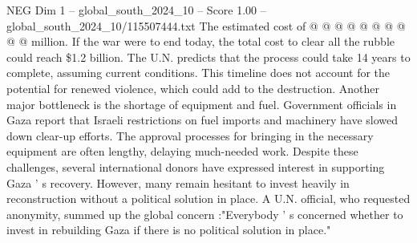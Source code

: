 \begin{textsample}{NEG Dim 1 – global\_south\_2024\_10 – Score 1.00 – global\_south\_2024\_10/115507444.txt}
The estimated cost of @ @ @ @ @ @ @ @ @ @ million.
If the war were to end today, the total cost to clear all the rubble could reach \$1.2 billion.
The U.N. predicts that the process could take 14 years to complete, assuming current conditions.
This timeline does not account for the potential for renewed violence, which could add to the destruction.
Another major bottleneck is the shortage of equipment and fuel.
Government officials in Gaza report that Israeli restrictions on fuel imports and machinery have slowed down clear-up efforts.
The approval processes for bringing in the necessary equipment are often lengthy, delaying much-needed work.
Despite these challenges, several international donors have expressed interest in supporting Gaza ' s recovery.
However, many remain hesitant to invest heavily in reconstruction without a political solution in place.
A U.N. official, who requested anonymity, summed up the global concern :"Everybody ' s concerned whether to invest in rebuilding Gaza if there is no political solution in place."

\end{textsample}
